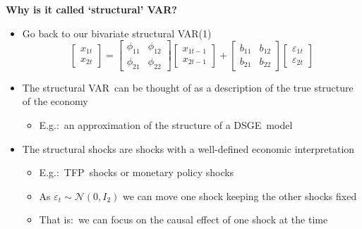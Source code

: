 \documentclass[10pt,english,t,aspectratio=169,ignorenonframetext]{beamer}
\begin{document}
\begin{frame}
{\textbf{Why is it called `structural' VAR?}}\medskip

\begin{itemize}
\item Go back to our bivariate structural VAR(1)%
\begin{equation*}
\begin{bmatrix}
x_{1t} \\ 
x_{2t}%
\end{bmatrix}%
=\left[ 
\begin{array}{cc}
\phi _{11} & \phi _{12} \\ 
\phi _{21} & \phi _{22}%
\end{array}%
\right] 
\begin{bmatrix}
x_{1t-1} \\ 
x_{2t-1}%
\end{bmatrix}%
+\left[ 
\begin{array}{cc}
b_{11} & b_{12} \\ 
b_{21} & b_{22}%
\end{array}%
\right] 
\begin{bmatrix}
\varepsilon _{1t} \\ 
\varepsilon _{2t}%
\end{bmatrix}%
\end{equation*}

\item The structural VAR\ can be thought of as a description of the true
structure of the economy\smallskip

\begin{itemize}
\item E.g.:\ an approximation of the structure of a DSGE\ model\bigskip
\end{itemize}

\item The structural shocks are shocks with a well-defined economic
interpretation\smallskip

\begin{itemize}
\item E.g.:\ TFP\ shocks or monetary policy shocks\medskip

\item As $\varepsilon _{t}\sim \mathcal{N}(0,I_{2})$ we can move one shock
keeping the other shocks fixed\medskip

\item That is:\ we can focus on the causal effect of one shock at the time
\end{itemize}
\end{itemize}
\end{frame}
\end{document}
